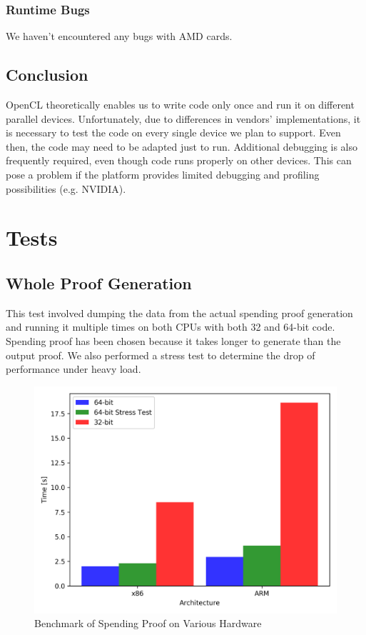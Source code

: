 \subsubsection{Runtime Bugs}
We haven't encountered any bugs with AMD cards.

\subsection{Conclusion}

OpenCL theoretically enables us to write code only once and run it on different parallel devices. Unfortunately, due to differences in vendors' implementations, it is necessary to test the code on every single device we plan to support. Even then, the code may need to be adapted just to run. Additional debugging is also frequently required, even though code runs properly on other devices. This can pose a problem if the platform provides limited debugging and profiling possibilities (e.g. NVIDIA).

\section{Tests}

\subsection{Whole Proof Generation}

This test involved dumping the data from the actual spending proof generation and running it multiple times on both CPUs with both 32 and 64-bit code. Spending proof has been chosen because it takes longer to generate than the output proof. We also performed a stress test to determine the drop of performance under heavy load.

\begin{figure}[h]
    \centering
    \includegraphics[width=.75\linewidth]{Figures/wholeproof.png}
    \caption{Benchmark of Spending Proof on Various Hardware}
    \label{fig:spendingproof}
\end{figure}

